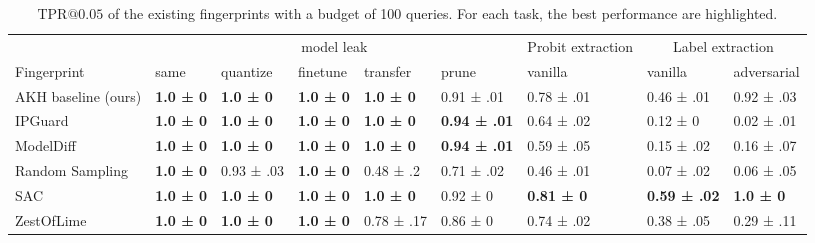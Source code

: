 \begin{table*}[t]
\small
\centering
\caption{$\text{TPR}@0.05$ of the existing fingerprints with a budget of 100 queries. For each task, the best performance are highlighted.}
\label{tab:task_perf}
\begin{tabular}{l|lllll|ll|l}
\toprule
 & \multicolumn{5}{c}{model leak} & Probit extraction & \multicolumn{2}{c}{Label extraction} \\
Fingerprint & same & quantize & finetune & transfer & prune & vanilla & vanilla & adversarial \\
\midrule
AKH baseline (ours) & \bfseries 1.0 ± \scriptsize0 & \bfseries 1.0 ± \scriptsize0 & \bfseries 1.0 ± \scriptsize0 & \bfseries 1.0 ± \scriptsize0 & 0.91 ± \scriptsize.01 & 0.78 ± \scriptsize.01 & 0.46 ± \scriptsize.01 & 0.92 ± \scriptsize.03 \\
IPGuard & \bfseries 1.0 ± \scriptsize0 & \bfseries 1.0 ± \scriptsize0 & \bfseries 1.0 ± \scriptsize0 & \bfseries 1.0 ± \scriptsize0 & \bfseries 0.94 ± \scriptsize.01 & 0.64 ± \scriptsize.02 & 0.12 ± \scriptsize0 & 0.02 ± \scriptsize.01 \\
ModelDiff & \bfseries 1.0 ± \scriptsize0 & \bfseries 1.0 ± \scriptsize0 & \bfseries 1.0 ± \scriptsize0 & \bfseries 1.0 ± \scriptsize0 & \bfseries 0.94 ± \scriptsize.01 & 0.59 ± \scriptsize.05 & 0.15 ± \scriptsize.02 & 0.16 ± \scriptsize.07 \\
Random Sampling & \bfseries 1.0 ± \scriptsize0 & 0.93 ± \scriptsize.03 & \bfseries 1.0 ± \scriptsize0 & 0.48 ± \scriptsize.2 & 0.71 ± \scriptsize.02 & 0.46 ± \scriptsize.01 & 0.07 ± \scriptsize.02 & 0.06 ± \scriptsize.05 \\
SAC & \bfseries 1.0 ± \scriptsize0 & \bfseries 1.0 ± \scriptsize0 & \bfseries 1.0 ± \scriptsize0 & \bfseries 1.0 ± \scriptsize0 & 0.92 ± \scriptsize0 & \bfseries 0.81 ± \scriptsize0 & \bfseries 0.59 ± \scriptsize.02 & \bfseries 1.0 ± \scriptsize0 \\
ZestOfLime & \bfseries 1.0 ± \scriptsize0 & \bfseries 1.0 ± \scriptsize0 & \bfseries 1.0 ± \scriptsize0 & 0.78 ± \scriptsize.17 & 0.86 ± \scriptsize0 & 0.74 ± \scriptsize.02 & 0.38 ± \scriptsize.05 & 0.29 ± \scriptsize.11 \\
\bottomrule
\end{tabular}
\end{table*}

